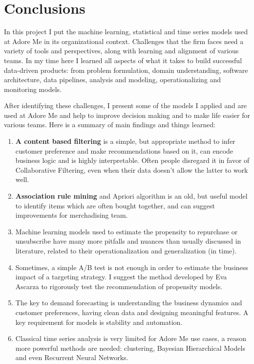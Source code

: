 \documentclass[12pt]{article}
\begin{document}
\section{Conclusions}

In this project I put the machine learning, statistical and time series models used at Adore Me in its organizational context. Challenges that the firm faces need a variety of tools and perspectives, along with learning and alignment of various teams. In my time here I learned all aspects of what it takes to build successful data-driven products: from problem formulation, domain understanding, software architecture, data pipelines, analysis and modeling, operationalizing and monitoring models.


After identifying these challenges, I present some of the models I applied and are used at Adore Me and help to improve decision making and to make life easier for various teams. Here is a summary of main findings and things learned:

\begin{enumerate}
	\item \textbf{A content based filtering} is a simple, but appropriate method to infer customer preference and make recommendations based on it, can encode business logic and is highly interpretable. Often people disregard it in favor of Collaborative Filtering, even when their data doesn't allow the latter to work well.
	\item \textbf{Association rule mining} and Apriori algorithm is an old, but useful model to identify items which are often bought together, and can suggest improvements for merchadising team.
	\item Machine learning models used to estimate  the propensity to repurchase or unsubscribe have many more pitfalls and nuances than usually discussed in literature, related to their operationalization and generalization (in time).
	\item Sometimes, a simple A/B test is not enough in order to estimate the business impact of a targeting strategy. I suggest the method developed by Eva Ascarza to rigorously test the recommendation of propensity models.
	\item The key to demand forecasting is understanding the business dynamics and customer preferences, having clean data and designing meaningful features. A key requirement for models is stability and automation. 
	\item Classical time series analysis is very limited for Adore Me use cases, a reason more powerful methods are needed: clustering, Bayesian Hierarchical Models and even Recurrent Neural Networks.
\end{enumerate}


\newpage



%
	
\end{document}
